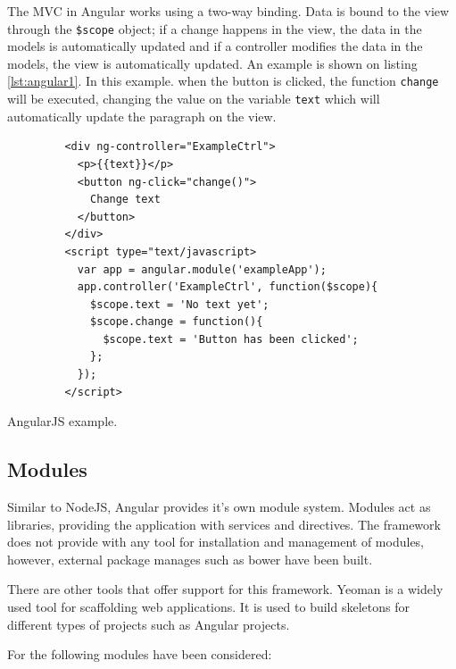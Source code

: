 The MVC in Angular works using a two-way binding. Data is bound to the view through the \texttt{\$scope} object; if a change happens in the view, the data in the models is automatically updated and if a controller modifies the data in the models, the view is automatically updated. An example is shown on listing \ref{lst:angular1}. In this example. when the button is clicked, the function \texttt{change} will be executed, changing the value on the variable \texttt{text} which will automatically update the paragraph on the view.

\begin{listing}[ht]\centering
  \begin{minipage}{.6\textwidth}
    \begin{verbatim}
	     <div ng-controller="ExampleCtrl">
	       <p>{{text}}</p>
	       <button ng-click="change()"> 
	         Change text 
	       </button>
	     </div>
	     <script type="text/javascript>
	       var app = angular.module('exampleApp');
	       app.controller('ExampleCtrl', function($scope){
	         $scope.text = 'No text yet';
	         $scope.change = function(){
	           $scope.text = 'Button has been clicked';
	         };
	       });
	     </script>
    \end{verbatim}
  \end{minipage}
  \caption{AngularJS example.}\label{lst:angular1}
\end{listing}

\subsection*{Modules}

Similar to NodeJS, Angular provides it's own module system. Modules act as libraries, providing the application with services and directives. The framework does not provide with any tool for installation and management of modules, however, external package manages such as bower \cite{bower} have been built.

There are other tools that offer support for this framework. Yeoman is a widely used tool for scaffolding web applications. It is used to build skeletons for different types of projects such as Angular projects.

For the following modules have been considered:

